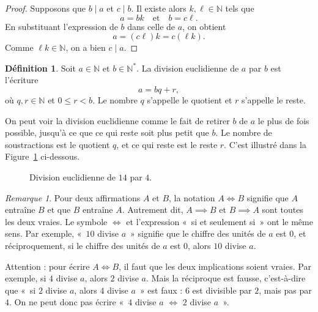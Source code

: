 \documentclass[12pt,a4paper]{article}
\theoremstyle{plain}
\theoremstyle{definition}
\newtheorem{definition}[theorem]{Définition}
\theoremstyle{remark}
\newtheorem*{remark}{Remarque}
\begin{document}
\begin{proof}
  Supposons que $b \mid a$ et $c \mid b$. Il existe alors $k,\ell\in\mathbb{N}$ tels que
  \[
    a=bk \quad\text{et}\quad b=c\ell.
  \]
  En substituant l'expression de $b$ dans celle de $a$, on obtient
  \[
    a=(c\ell)k=c(\ell k).
  \]
  Comme $\ell k\in\mathbb{N}$, on a bien $c\mid a$.
\end{proof}

\begin{tcolorbox}[navybar]
\begin{definition}
  Soit $a \in \mathbb{N}$ et $b \in \mathbb{N}^*$. La division
  euclidienne de $a$ par $b$ est l'écriture
  \[
    a = bq + r,
  \]
  où $q, r \in \mathbb{N}$ et $0 \le r < b$.
  Le nombre $q$ s'appelle le quotient et $r$ s'appelle le reste.
\end{definition}
\end{tcolorbox}

On peut voir la division euclidienne comme le fait de retirer $b$ de
$a$ le plus de fois possible, jusqu'à ce que ce qui reste soit plus
petit que $b$. Le nombre de soustractions est le quotient $q$, et ce
qui reste est le reste $r$. C'est illustré dans la
Figure~\ref{fig:division_euclidienne} ci-dessous.

\begin{figure}[htbp]
    \centering
    

    \caption{Division euclidienne de $14$ par $4$.}
    \label{fig:division_euclidienne}
\end{figure}

\begin{remark}
  Pour deux affirmations $A$ et $B$, la notation
  $A \Longleftrightarrow B$ signifie que $A$ entraîne $B$ et que $B$
  entraîne $A$. Autrement dit, $A \implies B$ et $B \implies A$ sont
  toutes les deux vraies. Le symbole $\Longleftrightarrow$ et
  l'expression «~si et seulement si~» ont le même sens. Par exemple,
  «~$10$ divise $a$~» signifie que le chiffre des unités de $a$ est
  $0$, et réciproquement, si le chiffre des unités de $a$ est $0$,
  alors $10$ divise $a$.

  Attention : pour écrire $A \Longleftrightarrow B$, il faut que les
  deux implications soient vraies. Par exemple, si $4$ divise $a$,
  alors $2$ divise $a$. Mais la réciproque est fausse, c'est-à-dire
  que «~si $2$ divise $a$, alors $4$ divise $a$~» est faux : $6$ est
  divisible par $2$, mais pas par $4$. On ne peut donc pas écrire
  «~$4$ divise $a$ $\Longleftrightarrow$ $2$ divise $a$~».
\end{remark}
\end{document}
